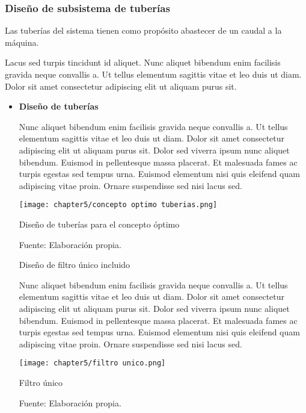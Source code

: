 \subsubsection{Diseño de subsistema de tuberías}

Las tuberías del sistema tienen como propósito abastecer de un caudal a la máquina.

Lacus sed turpis tincidunt id aliquet. Nunc aliquet bibendum enim facilisis gravida neque convallis a. Ut tellus elementum sagittis vitae et leo duis ut diam. Dolor sit amet consectetur adipiscing elit ut aliquam purus sit. 

\begin{itemize}
	
	\item \textbf{Diseño de tuberías}
	
	Nunc aliquet bibendum enim facilisis gravida neque convallis a. Ut tellus elementum sagittis vitae et leo duis ut diam. Dolor sit amet consectetur adipiscing elit ut aliquam purus sit. Dolor sed viverra ipsum nunc aliquet bibendum. Euismod in pellentesque massa placerat. Et malesuada fames ac turpis egestas sed tempus urna. Euismod elementum nisi quis eleifend quam adipiscing vitae proin. Ornare suspendisse sed nisi lacus sed.
	
	\begin{myfigure}[H]
		\centering
		\texttt{[image: chapter5/concepto optimo tuberias.png]}
		\caption{Diseño de tuberías para el concepto óptimo}
		\begin{myflushleftportland}
			Fuente: Elaboración propia.
		\end{myflushleftportland}
		\label{fig:concepto optimo tuberias}
	\end{myfigure}
	
	Diseño de filtro único incluido
	
	Nunc aliquet bibendum enim facilisis gravida neque convallis a. Ut tellus elementum sagittis vitae et leo duis ut diam. Dolor sit amet consectetur adipiscing elit ut aliquam purus sit. Dolor sed viverra ipsum nunc aliquet bibendum. Euismod in pellentesque massa placerat. Et malesuada fames ac turpis egestas sed tempus urna. Euismod elementum nisi quis eleifend quam adipiscing vitae proin. Ornare suspendisse sed nisi lacus sed.	
	
	\begin{myfigure}[H]
		\centering
		\texttt{[image: chapter5/filtro unico.png]}
		\caption{Filtro único}
		\begin{myflushleftportland}
			Fuente: Elaboración propia.
		\end{myflushleftportland}
		\label{fig:filtro unico}
	\end{myfigure}
	

\end{itemize}
